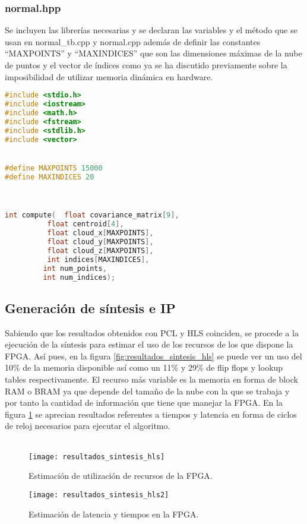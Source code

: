 \subsubsection{normal.hpp}
Se incluyen las librerías necesarias y se declaran las variables y el método que se usan en normal\_tb.cpp y normal.cpp además de definir las constantes ``MAXPOINTS'' y ``MAXINDICES'' que son las dimensiones máximas de la nube de puntos y el vector de índices como ya se ha discutido previamente sobre la imposibilidad de utilizar memoria dinámica en hardware.

\begin{lstlisting}[language=C++,breaklines]
#include <stdio.h>
#include <iostream>
#include <math.h>
#include <fstream>
#include <stdlib.h>
#include <vector>


#define MAXPOINTS 15000
#define MAXINDICES 20



int compute(  float covariance_matrix[9],
		  float centroid[4],
		  float cloud_x[MAXPOINTS],
		  float cloud_y[MAXPOINTS],
		  float cloud_z[MAXPOINTS],
		  int indices[MAXINDICES],
		 int num_points,
		 int num_indices);

\end{lstlisting}


\subsection{Generación de síntesis e IP}

Sabiendo que los resultados obtenidos con PCL y HLS coinciden, se procede a la ejecución de la síntesis para estimar el uso de los recursos de los que dispone la FPGA. Así pues, en la figura \ref{fig:resultados_sintesis_hls} se puede ver un uso del 10\% de la memoria disponible así como un 11\% y 29\% de flip flops y lookup tables respectivamente. El recurso más variable es la memoria en forma de block RAM o BRAM ya que depende del tamaño de la nube con la que se trabaja y por tanto la cantidad de información que tiene que manejar la FPGA. En la figura \ref{fig:resultados_sintesis_hls2} se aprecian resultados referentes a tiempos y latencia en forma de ciclos de reloj necesarios para ejecutar el algoritmo.
\\
\\
\begin{figure}[!htb]
  \texttt{[image: resultados\_sintesis\_hls]}
  \caption{Estimación de utilización de recursos de la FPGA.}\label{fig:resultados_sintesis_hls}
\endminipage\hfill
{}
  \texttt{[image: resultados\_sintesis\_hls2]}
  \caption{Estimación de latencia y tiempos en la FPGA.}\label{fig:resultados_sintesis_hls2}
\endminipage\hfill
\end{figure}

